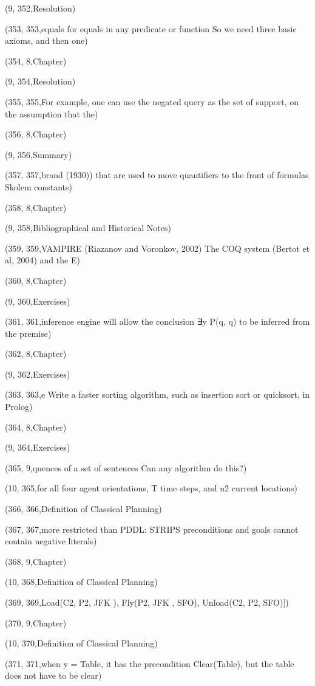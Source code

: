 (9, 352,Resolution)

(353, 353,equals for equals in any predicate or function So we need three basic axioms, and then one)

(354, 8,Chapter)

(9, 354,Resolution)

(355, 355,For example, one can use the negated query as the set of support, on the assumption that the)

(356, 8,Chapter)

(9, 356,Summary)

(357, 357,brand (1930)) that are used to move quantiﬁers to the front of formulas Skolem constants)

(358, 8,Chapter)

(9, 358,Bibliographical and Historical Notes)

(359, 359,VAMPIRE (Riazanov and Voronkov, 2002) The COQ system (Bertot et al, 2004) and the E)

(360, 8,Chapter)

(9, 360,Exercises)

(361, 361,inference engine will allow the conclusion ∃y P(q, q) to be inferred from the premise)

(362, 8,Chapter)

(9, 362,Exercises)

(363, 363,e Write a faster sorting algorithm, such as insertion sort or quicksort, in Prolog)

(364, 8,Chapter)

(9, 364,Exercises)

(365, 9,quences of a set of sentences Can any algorithm do this?)

(10, 365,for all four agent orientations, T time steps, and n2 current locations)

(366, 366,Deﬁnition of Classical Planning)

(367, 367,more restricted than PDDL: STRIPS preconditions and goals cannot contain negative literals)

(368, 9,Chapter)

(10, 368,Deﬁnition of Classical Planning)

(369, 369,Load(C2, P2, JFK ), Fly(P2, JFK , SFO), Unload(C2, P2, SFO)])

(370, 9,Chapter)

(10, 370,Deﬁnition of Classical Planning)

(371, 371,when y = Table, it has the precondition Clear(Table), but the table does not have to be clear)

